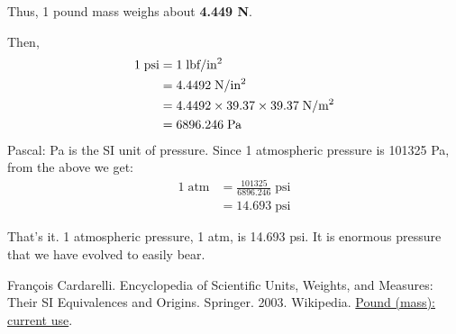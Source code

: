 \documentclass[a6paper]{article}
\begin{document}
Thus, 1 pound mass weighs about \textbf{4.449 \si{\newton}}.

Then, 
\begin{align*}
    1 \; \text{psi} 
    &= 1 \; \text{lbf/in\textsuperscript{2}} \\
    &= 4.4492 \; \text{N/in\textsuperscript{2}} \\
    &= 4.4492 \times 39.37 \times 39.37\; \text{N/m\textsuperscript{2}} \\
    &= 6896.246 \; \si{\pascal}
\end{align*}
Pascal: \si{\pascal} is the SI unit of pressure. Since 1 atmospheric pressure is 101325 \si{\pascal}, from the above we get:
\begin{align*}
    1 \; \text{atm} 
    &= \frac{101325}{6896.246} \;\text{psi} \\
    &= 14.693 \; \text{psi}
\end{align*}

That's it. 1 atmospheric pressure, 1 atm, is 14.693 psi. It is enormous pressure that we have evolved to easily bear.

\begin{thebibliography}{00}
     Fran{\c c}ois Cardarelli. Encyclopedia of Scientific Units, Weights, and Measures: Their SI Equivalences and Origins. Springer. 2003.
     Wikipedia. \href{https://en.wikipedia.org/wiki/Pound\_(mass)\#Current\_use}{Pound (mass): current use}.
\end{thebibliography}
\end{document}
